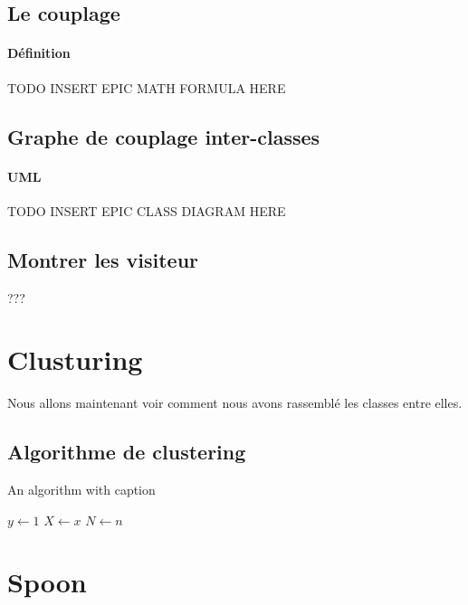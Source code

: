 \documentclass[a4paper]{article}
\begin{document}
\begin{multicols}{2}
        \subsection{Le couplage}
        \paragraph{Définition} TODO INSERT EPIC MATH FORMULA HERE 
        \subsection{Graphe de couplage inter-classes}

        \paragraph{UML} TODO INSERT EPIC CLASS DIAGRAM HERE 
        \subsection{Montrer les visiteur}
        ???
        \section{Clusturing}
        Nous allons maintenant voir comment nous avons rassemblé les classes entre elles. 
        \subsection{Algorithme de clustering}
        \begin{algorithm}
        \caption{An algorithm with caption}\label{alg:two}
        $y \gets 1$\;
        $X \gets x$\;
        $N \gets n$\;
        \end{algorithm}
        \section{Spoon}
    \end{multicols}
\end{document}
